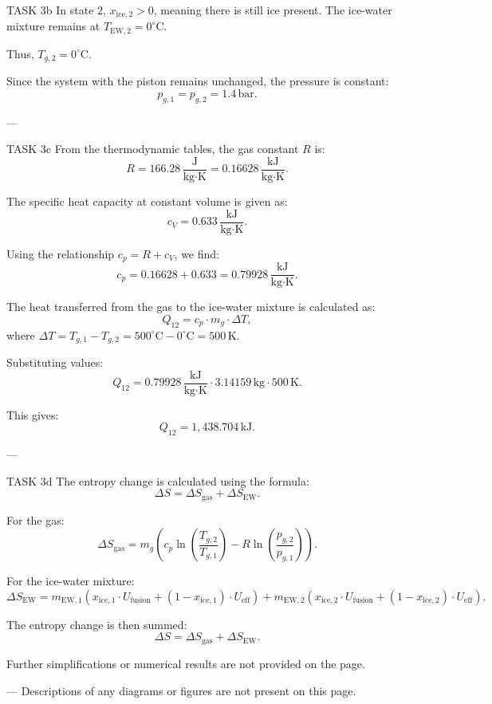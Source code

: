 TASK 3b  
In state 2, \( x_{\text{ice},2} > 0 \), meaning there is still ice present. The ice-water mixture remains at \( T_{\text{EW},2} = 0^\circ\text{C} \).  

Thus, \( T_{g,2} = 0^\circ\text{C} \).  

Since the system with the piston remains unchanged, the pressure is constant:  
\[
p_{g,1} = p_{g,2} = 1.4 \, \text{bar}.
\]

---

TASK 3c  
From the thermodynamic tables, the gas constant \( R \) is:  
\[
R = 166.28 \, \frac{\text{J}}{\text{kg·K}} = 0.16628 \, \frac{\text{kJ}}{\text{kg·K}}.
\]  

The specific heat capacity at constant volume is given as:  
\[
c_V = 0.633 \, \frac{\text{kJ}}{\text{kg·K}}.
\]  

Using the relationship \( c_p = R + c_V \), we find:  
\[
c_p = 0.16628 + 0.633 = 0.79928 \, \frac{\text{kJ}}{\text{kg·K}}.
\]  

The heat transferred from the gas to the ice-water mixture is calculated as:  
\[
Q_{12} = c_p \cdot m_g \cdot \Delta T,
\]  
where \( \Delta T = T_{g,1} - T_{g,2} = 500^\circ\text{C} - 0^\circ\text{C} = 500 \, \text{K} \).  

Substituting values:  
\[
Q_{12} = 0.79928 \, \frac{\text{kJ}}{\text{kg·K}} \cdot 3.14159 \, \text{kg} \cdot 500 \, \text{K}.
\]  

This gives:  
\[
Q_{12} = 1,438.704 \, \text{kJ}.
\]

---

TASK 3d  
The entropy change is calculated using the formula:  
\[
\Delta S = \Delta S_{\text{gas}} + \Delta S_{\text{EW}}.
\]  

For the gas:  
\[
\Delta S_{\text{gas}} = m_g \left( c_p \ln\left(\frac{T_{g,2}}{T_{g,1}}\right) - R \ln\left(\frac{p_{g,2}}{p_{g,1}}\right) \right).
\]  

For the ice-water mixture:  
\[
\Delta S_{\text{EW}} = m_{\text{EW},1} \left( x_{\text{ice},1} \cdot U_{\text{fusion}} + (1 - x_{\text{ice},1}) \cdot U_{\text{eff}} \right)  
+ m_{\text{EW},2} \left( x_{\text{ice},2} \cdot U_{\text{fusion}} + (1 - x_{\text{ice},2}) \cdot U_{\text{eff}} \right).
\]  

The entropy change is then summed:  
\[
\Delta S = \Delta S_{\text{gas}} + \Delta S_{\text{EW}}.
\]  

Further simplifications or numerical results are not provided on the page.  

---  
Descriptions of any diagrams or figures are not present on this page.